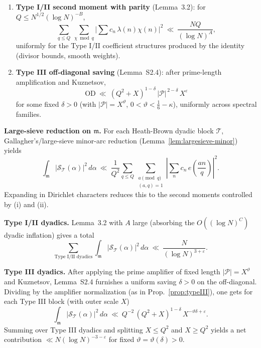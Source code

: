 \documentclass[11pt]{article}
\theoremstyle{definition}
\theoremstyle{remark}
\begin{document}
\begin{enumerate}[label=(\roman*)]
	\item \textbf{Type I/II second moment with parity} (Lemma~3.2): for $Q\le N^{1/2}(\log N)^{-B}$,
	      \[
		      \sum_{q\le Q}\ \sum_{\chi\bmod q}\Big|\sum c_n\,\lambda(n)\chi(n)\Big|^2
		      \ \ll\ \frac{NQ}{(\log N)^A},
	      \]
	      uniformly for the Type I/II coefficient structures produced by the identity (divisor bounds, smooth weights).

	\item \textbf{Type III off-diagonal saving} (Lemma~S2.4): after prime-length amplification and Kuznetsov,
	      \[
		      \mathrm{OD}\ \ll\ (Q^2+X)^{1-\delta}\,|\mathcal P|^{\,2-\delta}\,X^{\varepsilon}
	      \]
	      for some fixed $\delta>0$ (with $|\mathcal P|=X^\vartheta$, $0<\vartheta<\tfrac16-\kappa$), uniformly across spectral families.
\end{enumerate}

\medskip
\noindent\textbf{Large-sieve reduction on $\mathfrak m$.} For each Heath-Brown dyadic block $\mathcal T$, Gallagher’s/large-sieve minor-arc reduction (Lemma~\ref{lem:largesieve-minor}) yields
\[
	\int_{\mathfrak m}\big|\mathcal S_{\mathcal T}(\alpha)\big|^2\,d\alpha
	\ \ll\ \frac{1}{Q^2}\sum_{q\le Q}\sum_{\substack{a\!\!\!\pmod q\\(a,q)=1}}
	\left|\sum_n c_n\,e\!\left(\frac{an}{q}\right)\right|^2.
\]
Expanding in Dirichlet characters reduces this to the second moments controlled by (i) and (ii).

\medskip
\noindent\textbf{Type I/II dyadics.} Lemma~3.2 with $A$ large (absorbing the $O((\log N)^C)$ dyadic inflation) gives a total
\[
	\sum_{\text{Type I/II dyadics}}
	\int_{\mathfrak m}\big|\mathcal S_{\mathcal T}(\alpha)\big|^2\,d\alpha
	\ \ll\ \frac{N}{(\log N)^{3+\varepsilon}}.
\]

\medskip
\noindent\textbf{Type III dyadics.} After applying the prime amplifier of fixed length $|\mathcal P|=X^\vartheta$ and Kuznetsov, Lemma~S2.4 furnishes a uniform saving $\delta>0$ on the off-diagonal. Dividing by the amplifier normalization (as in Prop.~\ref{prop:typeIII}), one gets for each Type III block (with outer scale $X$)
\[
	\int_{\mathfrak m}\big|\mathcal S_{\mathcal T}(\alpha)\big|^2\,d\alpha
	\ \ll\ Q^{-2}\,(Q^2+X)^{1-\delta}\,X^{-\vartheta\delta+\varepsilon}.
\]
Summing over Type III dyadics and splitting $X\le Q^2$ and $X\ge Q^2$ yields a net contribution $\ll N(\log N)^{-3-\varepsilon}$ for fixed $\vartheta=\vartheta(\delta)>0$.
\end{document}

